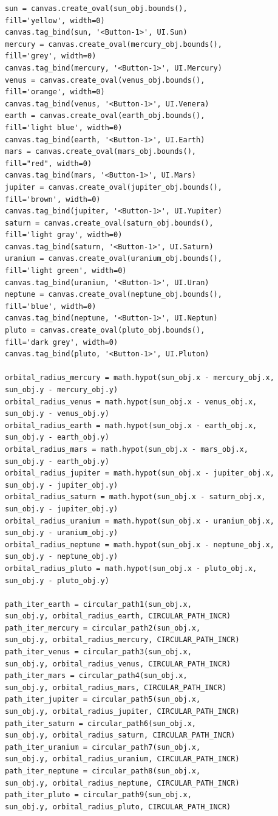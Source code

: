 \documentclass[11pt,a4paper]{report}
\begin{document}
\begin{verbatim}
sun = canvas.create_oval(sun_obj.bounds(), 
fill='yellow', width=0)
canvas.tag_bind(sun, '<Button-1>', UI.Sun)
mercury = canvas.create_oval(mercury_obj.bounds(), 
fill='grey', width=0)
canvas.tag_bind(mercury, '<Button-1>', UI.Mercury)
venus = canvas.create_oval(venus_obj.bounds(),
fill='orange', width=0)
canvas.tag_bind(venus, '<Button-1>', UI.Venera)
earth = canvas.create_oval(earth_obj.bounds(), 
fill='light blue', width=0)
canvas.tag_bind(earth, '<Button-1>', UI.Earth)
mars = canvas.create_oval(mars_obj.bounds(), 
fill="red", width=0)
canvas.tag_bind(mars, '<Button-1>', UI.Mars)
jupiter = canvas.create_oval(jupiter_obj.bounds(), 
fill='brown', width=0)
canvas.tag_bind(jupiter, '<Button-1>', UI.Yupiter)
saturn = canvas.create_oval(saturn_obj.bounds(), 
fill='light gray', width=0)
canvas.tag_bind(saturn, '<Button-1>', UI.Saturn)
uranium = canvas.create_oval(uranium_obj.bounds(), 
fill='light green', width=0)
canvas.tag_bind(uranium, '<Button-1>', UI.Uran)
neptune = canvas.create_oval(neptune_obj.bounds(), 
fill='blue', width=0)
canvas.tag_bind(neptune, '<Button-1>', UI.Neptun)
pluto = canvas.create_oval(pluto_obj.bounds(), 
fill='dark grey', width=0)
canvas.tag_bind(pluto, '<Button-1>', UI.Pluton)

orbital_radius_mercury = math.hypot(sun_obj.x - mercury_obj.x, 
sun_obj.y - mercury_obj.y)
orbital_radius_venus = math.hypot(sun_obj.x - venus_obj.x, 
sun_obj.y - venus_obj.y)
orbital_radius_earth = math.hypot(sun_obj.x - earth_obj.x, 
sun_obj.y - earth_obj.y)
orbital_radius_mars = math.hypot(sun_obj.x - mars_obj.x, 
sun_obj.y - earth_obj.y)
orbital_radius_jupiter = math.hypot(sun_obj.x - jupiter_obj.x, 
sun_obj.y - jupiter_obj.y)
orbital_radius_saturn = math.hypot(sun_obj.x - saturn_obj.x, 
sun_obj.y - jupiter_obj.y)
orbital_radius_uranium = math.hypot(sun_obj.x - uranium_obj.x, 
sun_obj.y - uranium_obj.y)
orbital_radius_neptune = math.hypot(sun_obj.x - neptune_obj.x, 
sun_obj.y - neptune_obj.y)
orbital_radius_pluto = math.hypot(sun_obj.x - pluto_obj.x, 
sun_obj.y - pluto_obj.y)

path_iter_earth = circular_path1(sun_obj.x, 
sun_obj.y, orbital_radius_earth, CIRCULAR_PATH_INCR)
path_iter_mercury = circular_path2(sun_obj.x, 
sun_obj.y, orbital_radius_mercury, CIRCULAR_PATH_INCR)
path_iter_venus = circular_path3(sun_obj.x, 
sun_obj.y, orbital_radius_venus, CIRCULAR_PATH_INCR)
path_iter_mars = circular_path4(sun_obj.x, 
sun_obj.y, orbital_radius_mars, CIRCULAR_PATH_INCR)
path_iter_jupiter = circular_path5(sun_obj.x,
sun_obj.y, orbital_radius_jupiter, CIRCULAR_PATH_INCR)
path_iter_saturn = circular_path6(sun_obj.x, 
sun_obj.y, orbital_radius_saturn, CIRCULAR_PATH_INCR)
path_iter_uranium = circular_path7(sun_obj.x, 
sun_obj.y, orbital_radius_uranium, CIRCULAR_PATH_INCR)
path_iter_neptune = circular_path8(sun_obj.x,
sun_obj.y, orbital_radius_neptune, CIRCULAR_PATH_INCR)
path_iter_pluto = circular_path9(sun_obj.x, 
sun_obj.y, orbital_radius_pluto, CIRCULAR_PATH_INCR)


\end{verbatim}
\end{document}
